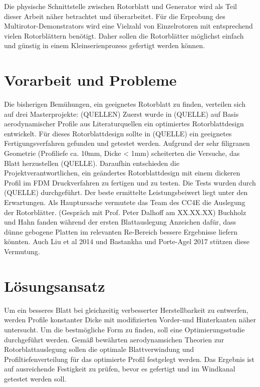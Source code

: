 Die physische Schnittstelle zwischen Rotorblatt und Generator wird als Teil dieser Arbeit näher betrachtet und überarbeitet. Für die Erprobung des Multirotor-Demonstrators wird eine Vielzahl von Einzelrotoren mit entsprechend vielen Rotorblättern benötigt. Daher sollen die Rotorblätter möglichst einfach und günstig in einem Kleinserienprozess gefertigt werden können.

\section{Vorarbeit und Probleme}
Die bisherigen Bemühungen, ein geeignetes Rotorblatt zu finden, verteilen sich auf drei Masterprojekte: (QUELLEN) Zuerst wurde in (QUELLE) auf Basis aerodynamischer Profile aus Literaturquellen ein optimiertes Rotorblattdesign entwickelt. Für dieses Rotorblattdesign sollte in (QUELLE) ein geeignetes Fertigungsverfahren gefunden und getestet werden. Aufgrund der sehr filigranen Geometrie (Profiliefe ca. 10mm, Dicke < 1mm) scheiterten die Versuche, das Blatt herzustellen (QUELLE). Daraufhin entschieden die Projektverantwortlichen, ein geändertes Rotorblattdesign mit einem dickeren Profil im FDM Druckverfahren zu fertigen und zu testen. Die Tests wurden durch (QUELLE) durchgeführt. Der beste ermittelte Leistungsbeiwert liegt unter den Erwartungen. Als Hauptursache vermutete das Team des CC4E die Auslegung der Rotorblätter. (Gespräch mit Prof. Peter Dalhoff am XX.XX.XX) Buchholz und Hahn fanden während der ersten Blattauslegung Anzeichen dafür, dass dünne gebogene Platten im relevanten Re-Bereich bessere Ergebnisse liefern könnten. Auch Liu et al 2014 und Bastankha und Porte-Agel 2017 stützen diese Vermutung.

\section{Lösungsansatz}
Um ein besseres Blatt bei gleichzeitig verbesserter Herstellbarkeit zu entwerfen, werden Profile konstanter Dicke mit modifizierten Vorder-und Hinterkanten näher untersucht. Um die bestmögliche Form zu finden, soll eine Optimierungsstudie durchgeführt werden. Gemäß bewährten aerodynamsichen Theorien zur Rotorblattauslegung sollen die optimale Blattverwindung und Profiltiefenverteilung für das optimierte Profil festgelegt werden. Das Ergebnis ist auf ausreichende Festigkeit zu prüfen, bevor es gefertigt und im Windkanal getestet werden soll.